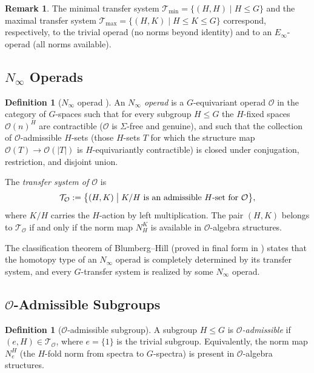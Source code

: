 \documentclass[12pt]{article}
\theoremstyle{definition}
\newtheorem{definition}[theorem]{Definition}
\newtheorem{remark}[theorem]{Remark}
\newcommand{\calO}{\mathcal{O}}
\begin{document}
\begin{remark}\label{rem:extremal-ts}
The minimal transfer system $\mathcal{T}_{\min} = \{(H,H) \mid H \leq G\}$ and the
maximal transfer system $\mathcal{T}_{\max} = \{(H,K) \mid H \leq K \leq G\}$ correspond,
respectively, to the trivial operad (no norms beyond identity) and to an $E_\infty$-operad
(all norms available).
\end{remark}

\subsection{\texorpdfstring{$N_\infty$}{N-infinity} Operads}

\begin{definition}[$N_\infty$ operad {\cite{BlumbergHill2015}}]
\label{def:ninfty-operad}
An \emph{$N_\infty$ operad} is a $G$-equivariant operad $\calO$ in the category of
$G$-spaces such that for every subgroup $H \leq G$ the $H$-fixed spaces $\calO(n)^H$ are
contractible ($\calO$ is $\Sigma$-free and genuine), and such that the collection of
$\calO$-admissible $H$-sets (those $H$-sets $T$ for which the structure map $\calO(T) \to
\calO(|T|)$ is $H$-equivariantly contractible) is closed under conjugation, restriction, and
disjoint union.

The \emph{transfer system of $\calO$} is
\[
  \mathcal{T}_\calO := \bigl\{(H,K) \bigm| K/H \text{ is an admissible $H$-set for }
  \calO\bigr\},
\]
where $K/H$ carries the $H$-action by left multiplication. The pair $(H,K)$ belongs to
$\mathcal{T}_\calO$ if and only if the norm map $N_H^K$ is available in $\calO$-algebra
structures.
\end{definition}

The classification theorem of Blumberg--Hill \cite{BlumbergHill2015} (proved in final form
in \cite{Rubin2021}) states that the homotopy type of an $N_\infty$ operad is completely
determined by its transfer system, and every $G$-transfer system is realized by some
$N_\infty$ operad.

\subsection{\texorpdfstring{$\calO$}{O}-Admissible Subgroups}

\begin{definition}[$\calO$-admissible subgroup]
\label{def:admissible}
A subgroup $H \leq G$ is \emph{$\calO$-admissible} if $(e, H) \in \mathcal{T}_\calO$, where
$e = \{1\}$ is the trivial subgroup. Equivalently, the norm map $N_e^H$ (the $H$-fold norm
from spectra to $G$-spectra) is present in $\calO$-algebra structures.
\end{definition}
\end{document}
